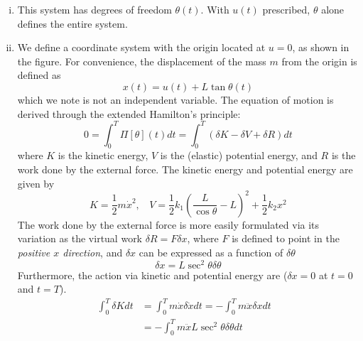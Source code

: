 \begin{enumerate}[(i)]
\item { %
    This system has  degrees of freedom $\theta(t)$. 
    With $u(t)$ prescribed, $\theta$ alone defines the entire system.
}
\item {
    We define a coordinate system with the origin located at $u = 0$, as shown in the figure.
    For convenience, the displacement of the mass $m$ from the origin is defined as 
    \begin{equation}\label{eqn:hw1_p1_x}
        x(t) = u(t) + L \tan \theta(t)
    \end{equation} 
    which we note is not an independent variable. 
    The equation of motion is derived through the extended Hamilton's principle:
    \begin{equation}\label{eqn:hw1_p1_hamilton}
        0 = \int_0^T \Pi[\theta](t) dt = \int_0^T (\delta K - \delta V + \delta R) dt 
    \end{equation}
    where $K$ is the kinetic energy, $V$ is the (elastic) potential energy, and $R$ is the work done by the external force. 
    The kinetic energy and potential energy are given by 
    \begin{equation}
        K = \frac{1}{2} m \dot{x}^2, ~~~~ V = \frac{1}{2} k_1 {\left(\frac{L}{\cos\theta} - L\right)}^2 + \frac{1}{2} k_2 x^2
    \end{equation}
    The work done by the external force is more easily formulated via its variation as the virtual work $\delta R = F \delta x$, where $F$ is defined to point in the \emph{positive $x$ direction}, and $\delta x$ can be expressed as a function of $\delta \theta$ 
    \begin{equation}
        \delta x = L \sec^2\theta \delta \theta
    \end{equation}
    Furthermore, the action via kinetic and potential energy are ($\delta x = 0$ at $t=0$ and $t=T$). 
    \begin{subequations}
    \begin{equation}
    \begin{aligned}
        \int_0^T \delta K dt &= \int_0^T m \dot{x} \delta \dot{x} dt = - \int_0^T m \ddot{x} \delta x dt \\
        &= - \int_0^T m \ddot{x} L \sec^2\theta \delta \theta dt
    \end{aligned}
    \end{equation}
    \begin{equation}
    \begin{aligned}

\end{aligned}
\end{equation}
\end{subequations}}
\end{enumerate}
